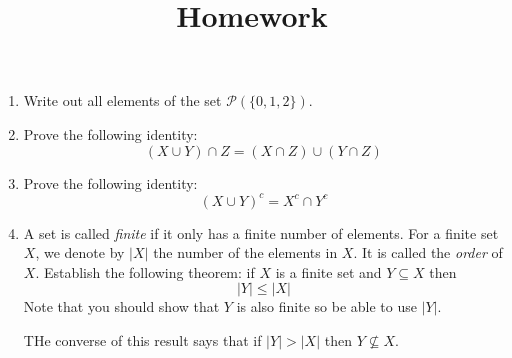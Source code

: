 \documentclass[12pt]{amsart}
\theoremstyle{definition}
\begin{document}
\title{Homework}

\maketitle

\begin{enumerate}
	\item Write out all elements of the set $\mathcal P(\{0,1,2\})$. 
		
	\item Prove the following identity: 
	\begin{displaymath}
		(X \cup Y) \cap Z = (X \cap Z) \cup (Y \cap Z)
	\end{displaymath}

	\item Prove the following identity:
	\begin{displaymath}
		(X \cup Y)^c = X^c \cap Y^c
	\end{displaymath}

	\item A set is called \textit{finite} if it only has a finite number of elements. 
		For a finite set $X$, we denote by $|X|$ the number of the elements 
		in $X$. It is called the \textit{order} of $X$. Establish the following 
		theorem: if $X$ is a finite set and $Y \subseteq X$ then 
		\begin{displaymath}
			|Y| \leq |X| 
		\end{displaymath}
		Note that you should show that $Y$ is also finite so be able to 
		use $|Y|$. 

		THe converse of this result says that if $|Y| > |X|$ then $Y \nsubseteq X$. 


\end{enumerate}
\end{document}
